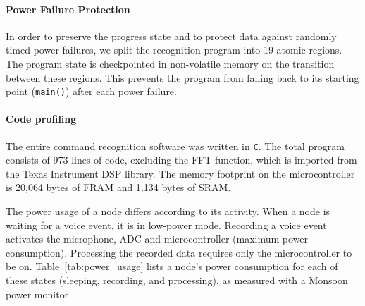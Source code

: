 \paragraph{Power Failure Protection}
In order to preserve the progress state and to protect \cim data against randomly timed power failures, we split the recognition program into 19 atomic regions. 
The program state is checkpointed in non-volatile memory on the transition between these regions. This prevents the program from falling back to its starting point (\texttt{main()}) after each power failure. 

\paragraph{Code profiling}
The entire command recognition software was written in {\tt C}. The total program consists of 973 lines of code, excluding the FFT function, which is imported from the Texas Instrument DSP library.
The memory footprint on the microcontroller is 20,064 bytes of FRAM and 1,134 bytes of SRAM.

The power usage of a node differs according to its activity. When a node is waiting for a voice event, it is in low-power mode. Recording a voice event activates the microphone, ADC and microcontroller (maximum power consumption). Processing the recorded data requires only the microcontroller to be on. Table~\ref{tab:power_usage} lists a node's power consumption for each of these states (sleeping, recording, and processing), as measured with a Monsoon power monitor~\cite{monsoon}. 




